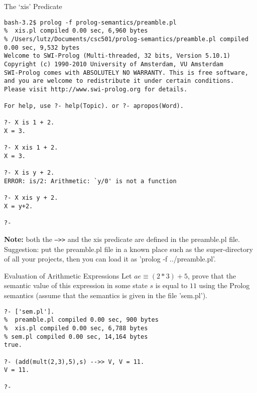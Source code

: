 \documentclass{beamer}
\begin{document}
\begin{frame}[fragile]{The `xis' Predicate}

\tiny
\begin{verbatim}
bash-3.2$ prolog -f prolog-semantics/preamble.pl
%  xis.pl compiled 0.00 sec, 6,960 bytes
% /Users/lutz/Documents/csc501/prolog-semantics/preamble.pl compiled 0.00 sec, 9,532 bytes
Welcome to SWI-Prolog (Multi-threaded, 32 bits, Version 5.10.1)
Copyright (c) 1990-2010 University of Amsterdam, VU Amsterdam
SWI-Prolog comes with ABSOLUTELY NO WARRANTY. This is free software,
and you are welcome to redistribute it under certain conditions.
Please visit http://www.swi-prolog.org for details.

For help, use ?- help(Topic). or ?- apropos(Word).

?- X is 1 + 2.
X = 3.

?- X xis 1 + 2.
X = 3.

?- X is y + 2.
ERROR: is/2: Arithmetic: `y/0' is not a function

?- X xis y + 2.
X = y+2.

?- 
\end{verbatim}
\scriptsize
{\bf Note:} both the {\tt -->>} and the xis predicate are defined in the preamble.pl file.  Suggestion: put the preamble.pl file
in a known place such as the super-directory of all your projects, then you can load it as 'prolog -f ../preamble.pl'.
\end{frame}



\begin{frame}[fragile]{Evaluation of Arithmetic Expressions}
\small
Let $ae \equiv (2 * 3) + 5$, prove that the semantic value of this expression in some state $s$ is equal  to $11$ using the Prolog semantics (assume that the semantics is given in the file 'sem.pl').

\begin{verbatim}
?- ['sem.pl'].
%  preamble.pl compiled 0.00 sec, 900 bytes
%  xis.pl compiled 0.00 sec, 6,788 bytes
% sem.pl compiled 0.00 sec, 14,164 bytes
true.

?- (add(mult(2,3),5),s) -->> V, V = 11.
V = 11.

?- 
\end{verbatim}
\end{frame}
\end{document}
